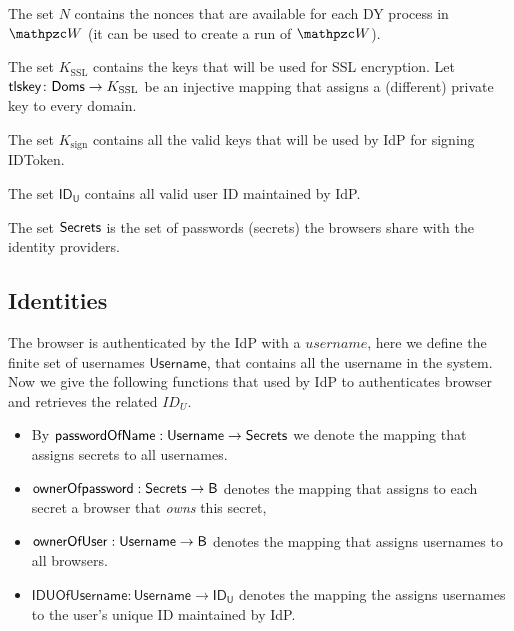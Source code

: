   The set $N$ contains the nonces that are available for each DY process
  in $\bidsystem$ (it can be used to create a run of $\bidsystem$). 
  
  The set $K_\text{SSL}$ contains the keys that will be used for SSL
  encryption. Let $\mathsf{tlskey}\colon \mathsf{Doms} \to K_\text{SSL}$ be an injective
  mapping that assigns a (different) private key to every domain.
  
  The set $K_\text{sign}$ contains all the valid keys that will be used by IdP for signing IDToken. 
  
  The set $\mathsf{ID_U}$ contains all valid user ID maintained by IdP. 
  
  The set $\mathsf{Secrets}$ is the set of passwords (secrets) 
  the browsers share with the identity providers. 
  
  
  
  \subsection{Identities}\label{app:uppresso-identities}
	The browser is authenticated by the IdP with a $username$, here we define the finite set of usernames $\mathsf{Username}$, that contains all the username in the system.
	Now we give the following functions that used by IdP to authenticates  browser and retrieves the related $ID_U$.
	\begin{itemize}
	\item By $\mathsf{passwordOfName}:\mathsf{Username} \to \mathsf{Secrets}$ we denote the mapping that assigns secrets to all usernames.
	\item $\mathsf{ownerOfpassword}: \mathsf{Secrets} \to \mathsf{B}$ denotes the 
  mapping that assigns to each secret a browser that 
  \emph{owns} this secret,
  	\item $\mathsf{ownerOfUser}: \mathsf{Username} \to \mathsf{B}$ denotes the mapping that assigns usernames to all browsers.
  	\item $\mathsf{IDUOfUsername}: \mathsf{Username} \to \mathsf{ID_U}$ denotes the mapping the assigns usernames to the user's unique ID maintained by IdP. 
	\end{itemize}		
	
